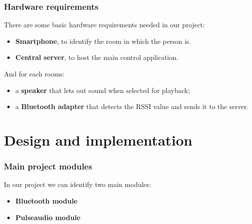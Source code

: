 \documentclass{beamer}
\begin{document}
	\begin{frame}
		\frametitle{Hardware requirements}
		There are some basic hardware requirements needed in our project:
		\pause
		\begin{itemize}
		\item \textbf{Smartphone}, to identify the room in which the person is.
		\item \textbf{Central server}, to host the main control application.
		\end{itemize}
		\pause
		And for each rooms:
		\begin{itemize}
		\item a \textbf{speaker} that lets out sound when selected for playback;
		\item a \textbf{Bluetooth adapter} that detects the RSSI value and sends it to the server.
		\end{itemize}
		
		 
		
	\end{frame}
	

\section{Design and implementation}

	\begin{frame}
	\frametitle{Main project modules}
		In our project we can identify two main modules:
		\begin{itemize}
		\item \textbf{Bluetooth module}
		\item \textbf{Pulseaudio module}
		\end{itemize}
	\end{frame}
\end{document}

